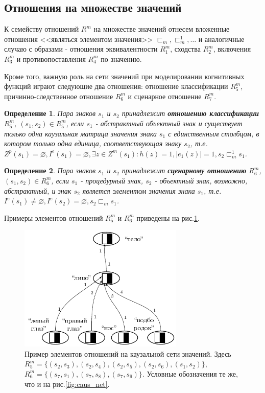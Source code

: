 \documentclass[12pt]{scrartcl}
\newtheorem{definition}{Определение}
\begin{document}
	\subsection{Отношения на множестве значений}	
	
	К семейству отношений $R^m$ на множестве значений отнесем вложенные отношения <<являться элементом значения>> ${\sqsubset_m,\sqsubset_m^1,\dots}$ и аналогичные случаю с образами - отношения эквивалентности $R_1^m$, сходства $R_2^m$, включения $R_3^m$ и противопоставления $R_4^m$ по значению.
	
	Кроме того, важную роль на сети значений при моделировании когнитивных функций играют следующие два отношения: отношение классификации $R_5^m$, причинно-следственное отношение $R_6^m$ и сценарное отношение $R_7^m$.
	
	\begin{definition}
		Пара знаков $s_1$ и $s_2$ принадлежит \textbf{отношению классификации} $R_5^m$, $(s_1,s_2)\in R_5^m$, если $s_1$ - абстрактный объектный знак и существует только одна каузальная матрица значения знака $s_1$ с единственным столбцом, в котором только одна единица, соответствующая знаку $s_2$, т.е. $Z^p(s_1)=\varnothing, I^e(s_1)=\varnothing, \exists z\in Z^m(s_1): h(z)=1, |e_1(z)|=1, s_2\sqsubset_m^1 s_1$.
	\end{definition}
	
	\begin{definition}
		Пара знаков $s_1$ и $s_2$ принадлежит \textbf{сценарному отношению} $R_6^m$, $(s_1,s_2)\in R_6^m$, если $s_1$ - процедурный знак, $s_2$ - объектный знак, возможно, абстрактный, и знак $s_2$ является элементом значения знака $s_1$, т.е. $I^e(s_1)\not = \varnothing, I^e(s_2) = \varnothing, s_2\sqsubset_m s_1$.
	\end{definition}
	
	Примеры элементов отношений $R_5^m$ и $R_6^m$ приведены на рис.\ref{fig:signif_relat}.
	
	\begin{figure}[h]
		\centering
		\includegraphics[width=0.7\textwidth,page=2]{examples/causnet/caus_net}
		\caption{Пример элементов отношений на каузальной сети значений. Здесь $R_5^m=\{(s_2,s_3),(s_2,s_4),(s_2,s_5),(s_2,s_6),(s_1,s_2)\}$, $R_6^m=\{(s_7,s_1),(s_7,s_8),(s_7,s_9)\}$. Условные обозначения те же, что и на рис.\ref{fig:caus_net}.}
		\label{fig:signif_relat}		
	\end{figure}
	
\end{document}
